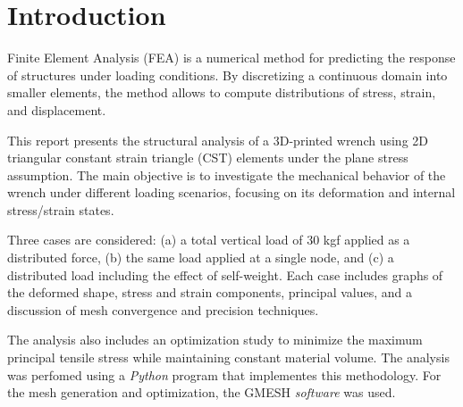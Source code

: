 \documentclass{article}  %
\begin{document}
\newpage
\thispagestyle{empty} %


\newpage
\setcounter{page}{1}

\section{Introduction}

Finite Element Analysis (FEA) is a numerical method for predicting the response of structures under loading conditions. By discretizing a continuous domain into smaller elements, the method allows to compute distributions of stress, strain, and displacement.

This report presents the structural analysis of a 3D-printed wrench using 2D triangular constant strain triangle (CST) elements under the plane stress assumption. The main objective is to investigate the mechanical behavior of the wrench under different loading scenarios, focusing on its deformation and internal stress/strain states.

Three cases are considered: (a) a total vertical load of 30 kgf applied as a distributed force, (b) the same load applied at a single node, and (c) a distributed load including the effect of self-weight. Each case includes graphs of the deformed shape, stress and strain components, principal values, and a discussion of mesh convergence and precision techniques.

The analysis also includes an optimization study to minimize the maximum principal tensile stress while maintaining constant material volume. The analysis was perfomed using a \textit{Python} program that implementes this methodology. For the mesh generation and optimization, the GMESH \textit{software} was used.
\end{document}
